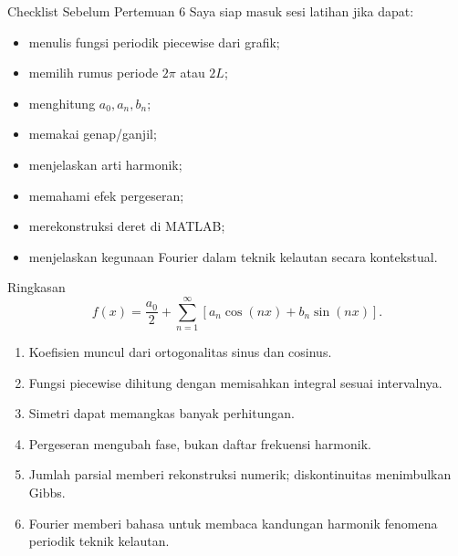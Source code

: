 \documentclass[aspectratio=169,10pt]{beamer}
\begin{document}
\begin{frame}{Checklist Sebelum Pertemuan 6}
Saya siap masuk sesi latihan jika dapat:
\begin{itemize}
\item[$\square$] menulis fungsi periodik piecewise dari grafik;
\item[$\square$] memilih rumus periode $2\pi$ atau $2L$;
\item[$\square$] menghitung $a_0,a_n,b_n$;
\item[$\square$] memakai genap/ganjil;
\item[$\square$] menjelaskan arti harmonik;
\item[$\square$] memahami efek pergeseran;
\item[$\square$] merekonstruksi deret di MATLAB;
\item[$\square$] menjelaskan kegunaan Fourier dalam teknik kelautan secara kontekstual.
\end{itemize}
\end{frame}


\begin{frame}{Ringkasan}
\[
f(x)=\frac{a_0}{2}+\sum_{n=1}^{\infty}
[a_n\cos(nx)+b_n\sin(nx)].
\]
\begin{enumerate}
\item Koefisien muncul dari ortogonalitas sinus dan cosinus.
\item Fungsi piecewise dihitung dengan memisahkan integral sesuai intervalnya.
\item Simetri dapat memangkas banyak perhitungan.
\item Pergeseran mengubah fase, bukan daftar frekuensi harmonik.
\item Jumlah parsial memberi rekonstruksi numerik; diskontinuitas menimbulkan Gibbs.
\item Fourier memberi bahasa untuk membaca kandungan harmonik fenomena periodik teknik kelautan.
\end{enumerate}
\end{frame}
\end{document}
